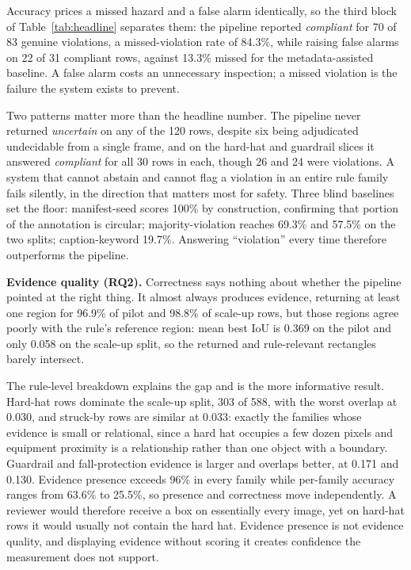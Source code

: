 \documentclass[12pt,letterpaper]{article}
\begin{document}
Accuracy prices a missed hazard and a false alarm identically, so the third block of Table~\ref{tab:headline} separates them: the pipeline reported \textit{compliant} for 70 of 83 genuine violations, a missed-violation rate of 84.3\%, while raising false alarms on 22 of 31 compliant rows, against 13.3\% missed for the metadata-assisted baseline. A false alarm costs an unnecessary inspection; a missed violation is the failure the system exists to prevent.

Two patterns matter more than the headline number. The pipeline never returned \textit{uncertain} on any of the 120 rows, despite six being adjudicated undecidable from a single frame, and on the hard-hat and guardrail slices it answered \textit{compliant} for all 30 rows in each, though 26 and 24 were violations. A system that cannot abstain and cannot flag a violation in an entire rule family fails silently, in the direction that matters most for safety. Three blind baselines set the floor: manifest-seed scores 100\% by construction, confirming that portion of the annotation is circular; majority-violation reaches 69.3\% and 57.5\% on the two splits; caption-keyword 19.7\%. Answering ``violation'' every time therefore outperforms the pipeline.

\textbf{Evidence quality (RQ2).} Correctness says nothing about whether the pipeline pointed at the right thing. It almost always produces evidence, returning at least one region for 96.9\% of pilot and 98.8\% of scale-up rows, but those regions agree poorly with the rule's reference region: mean best IoU is 0.369 on the pilot and only 0.058 on the scale-up split, so the returned and rule-relevant rectangles barely intersect.

The rule-level breakdown explains the gap and is the more informative result. Hard-hat rows dominate the scale-up split, 303 of 588, with the worst overlap at 0.030, and struck-by rows are similar at 0.033: exactly the families whose evidence is small or relational, since a hard hat occupies a few dozen pixels and equipment proximity is a relationship rather than one object with a boundary. Guardrail and fall-protection evidence is larger and overlaps better, at 0.171 and 0.130. Evidence presence exceeds 96\% in every family while per-family accuracy ranges from 63.6\% to 25.5\%, so presence and correctness move independently. A reviewer would therefore receive a box on essentially every image, yet on hard-hat rows it would usually not contain the hard hat. Evidence presence is not evidence quality, and displaying evidence without scoring it creates confidence the measurement does not support.
\end{document}
